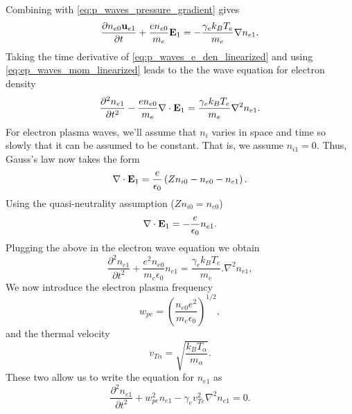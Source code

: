 \documentclass[a4paper,11pt]{report}
\begin{document}
Combining  with \cref{eq:p_waves_pressure_gradient} gives
\begin{equation}
    \label{eq:ep_waves_mom_linearized}
    \frac{\partial n_{e0} \mathbf{u}_{e1}}{\partial t} + \frac{e n_{e0}}{m_e} \mathbf{E}_1 = - \frac{\gamma_e k_B T_e}{m_e} \nabla n_{e1}.
\end{equation}
Taking the time derivative of \cref{eq:p_waves_e_den_linearized} and using \cref{eq:ep_waves_mom_linearized} leads to the the wave equation for electron density
\begin{equation}
    \label{eq:ep_waves_den_combined}
    \frac{\partial^2 n_{e1}}{\partial t^2} - \frac{e n_{e0}}{m_e} \nabla \cdot \mathbf{E}_1 = \frac{\gamma_e k_B T_e}{m_e} \nabla^2 n_{e1}.
\end{equation}
For electron plasma waves, we'll assume that $n_{i}$ varies in space and time so slowly that it can be assumed to be constant. That is, we assume $n_{i1} = 0$. Thus, Gauss's law now takes the form
\begin{equation*}
    \nabla \cdot \mathbf{E}_1 = \frac{e}{\epsilon_0} \left ( Z n_{i0} - n_{e0} - n_{e1} \right ).
\end{equation*}
Using the quasi-neutrality assumption ($Zn_{i0} = n_{e0}$)
\begin{equation}
    \label{eq:ep_waves_efield_divergence}
    \nabla \cdot \mathbf{E}_1 = -\frac{e}{\epsilon_0} n_{e1}.
\end{equation}
Plugging the above in the electron wave equation we obtain
\begin{equation*}
    \frac{\partial^2 n_{e1}}{\partial t^2} + \frac{e^2 n_{e0}}{m_e \epsilon_0} n_{e1} = \frac{\gamma_e k_B T_e}{m_e}. \nabla^2 n_{e1},
\end{equation*}
We now introduce the electron plasma frequency
\begin{equation}
    \label{eq:ep_waves_frequency}
    w_{pe} = \left ( \frac{n_{e0} e^2}{m_e \epsilon_0} \right )^{1/2},
\end{equation}
and the thermal velocity
\begin{equation}
    \label{eq:ep_waves_thermal_vel}
    v_{T\alpha} = \sqrt{ \frac{k_B T_\alpha}{m_\alpha}}.
\end{equation}
These two allow us to write the equation for $n_{e1}$ as
\begin{equation}
    \label{eq:ep_waves_fluc_density}
    \frac{\partial^2 n_{e1}}{\partial t^2} + w^2_{pe} n_{e1} - \gamma_e v_{Te}^2 \nabla^2 n_{e1} = 0.
\end{equation}
\end{document}

